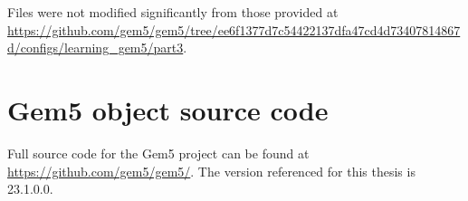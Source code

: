 \documentclass[12pt,twoside]{reedthesis}
\begin{document}
Files were not modified significantly from those provided at \url{https://github.com/gem5/gem5/tree/ee6f1377d7c54422137dfa47cd4d73407814867d/configs/learning_gem5/part3}.

\section{Gem5 object source code}

Full source code for the Gem5 project can be found at \url{https://github.com/gem5/gem5/}. The version referenced for this thesis is 23.1.0.0.

\nocite{*}
\printbibliography[title=References]
\end{document}
